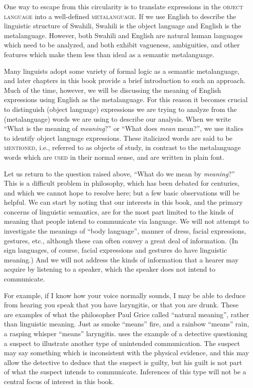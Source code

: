 One way to escape from this circularity is to translate expressions in the \textsc{object language} into a well-defined \textsc{metalanguage}. If we use English to describe the linguistic structure of  {Swahili},  {Swahili} is the object language and English is the metalanguage. However, both  {Swahili} and English are natural human languages which need to be analyzed, and both exhibit vagueness, ambiguities, and other features which make them less than ideal as a semantic metalanguage.



\newpage 
Many linguists adopt some variety of formal logic as a semantic metalanguage, and later chapters in this book provide a brief introduction to such an approach. Much of the time, however, we will be discussing the meaning of English expressions using English as the metalanguage. For this reason it becomes crucial to distinguish (object language) expressions we are trying to analyze from the (metalanguage) words we are using to describe our analysis. When we write “What is the meaning of \textit{meaning}?” or “What does \textit{mean} mean?”, we use italics to identify object language expressions. These italicized words are said to be \textsc{mentioned}, i.e., referred to as objects of study, in contrast to the metalanguage words which are \textsc{used} in their normal sense, and are written in plain font.



Let us return to the question raised above, “What do we mean by \textit{meaning}?” This is a difficult problem in philosophy, which has been debated for centuries, and which we cannot hope to resolve here; but a few basic observations will be helpful. We can start by noting that our interests in this book, and the primary concerns of linguistic semantics, are for the most part limited to the kinds of meaning that people intend to communicate via language. We will not attempt to investigate the meanings of “body language”, manner of dress, facial expressions, gestures, etc., although these can often convey a great deal of information. (In sign languages, of course, facial expressions and gestures do have linguistic meaning.) And we will not address the kinds of information that a hearer may acquire by listening to a speaker, which the speaker does not intend to communicate.



For example, if I know how your voice normally sounds, I may be able to deduce from hearing you speak that you have laryngitis, or that you are drunk. These are examples of what the philosopher Paul Grice called “natural meaning”, rather than linguistic meaning. Just as smoke “means” fire, and a rainbow “means” rain, a rasping whisper “means” laryngitis. \citet[15]{Levinson1983} uses the example of a detective questioning a suspect to illustrate another type of unintended communication. The suspect may say something which is inconsistent with the physical evidence, and this may allow the detective to deduce that the suspect is guilty, but his guilt is not part of what the suspect intends to communicate. Inferences of this type will not be a central focus of interest in this book.



